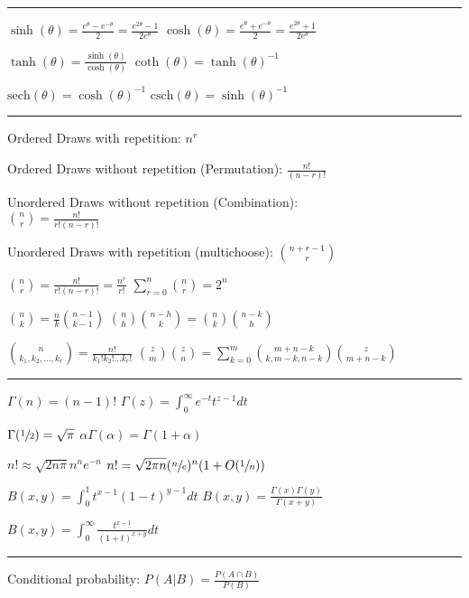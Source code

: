 \documentclass[notitlepage,10pt,twocolumn]{article}
\begin{document}
\hrule \vspace{.15cm}
$\sinh(\theta) = \frac{e^\theta-e^{-\theta}}{2} = \frac{e^{2\theta}-1}{2e^\theta}$
\quad $\cosh(\theta) = \frac{e^\theta+e^{-\theta}}{2} = \frac{e^{2\theta}+1}{2e^\theta}$

$\tanh (\theta) = \frac{\sinh(\theta)}{\cosh(\theta)}$ \quad \quad $\coth(\theta) = \tanh (\theta)^{-1}$

$\text{sech}(\theta) = \cosh(\theta)^{-1}$ \quad \quad $\text{csch}(\theta) = \sinh(\theta)^{-1}$

\vspace{.15cm} \hrule \vspace{.15cm}
Ordered Draws with repetition: $n^r$

Ordered Draws without repetition (Permutation): $\frac{n!}{(n-r)!}$

Unordered Draws without repetition (Combination):\\ $\binom{n}{r} = \frac{n!}{r!(n-r)!}$

Unordered Draws with repetition (multichoose): $\binom{n+r-1}{r}$

$\binom{n}{r} = \frac{n!}{r!(n-r)!} = \frac{n^r}{r!}$
\quad \quad
$\sum_{r=0}^n \binom{n}{r} = 2^n$

$\binom{n}{k} = \frac{n}{k} \binom{n-1}{k-1}$
\quad \quad
$\binom{n}{h}\binom{n-h}{k} = \binom{n}{k}\binom{n-k}{h}$

$\binom{n}{k_1,k_2,\dots,k_r} = \frac{n!}{k_1! k_2!\dots k_r!}$
\quad 
$\binom{z}{m}\binom{z}{n} = \sum_{k=0}^m \binom{m+n-k}{k,m-k,n-k}\binom{z}{m+n-k}$

\vspace{.2cm} \hrule \vspace{.2cm}

$\Gamma(n) = (n-1)!$
\quad \quad 
$\Gamma(z) = \int_0^\infty e^{-t} t^{z-1} dt$

$\Gamma(\sfrac{1}{2}) = \sqrt{\pi}$ \quad \quad $\alpha \Gamma(\alpha) = \Gamma(1+\alpha)$

$n! \approx \sqrt{2n\pi}n^ne^{-n}$ \quad \quad $n! = \sqrt{2\pi n}(\sfrac{n}{e})^n (1+ O(\sfrac{1}{n}))$

$B(x,y) = \int_0^1 t^{x-1}(1-t)^{y-1}dt$ \quad $B(x,y) = \frac{\Gamma(x)\Gamma(y)}{\Gamma(x+y)}$

$B(x,y) = \int_0^\infty \frac{t^{x-1}}{(1+t)^{x+y}}dt$

\vspace{.15cm} \hrule \vspace{.15cm}

Conditional probability: $P(A|B) = \frac{P(A\cap B)}{P(B)}$
\end{document}
